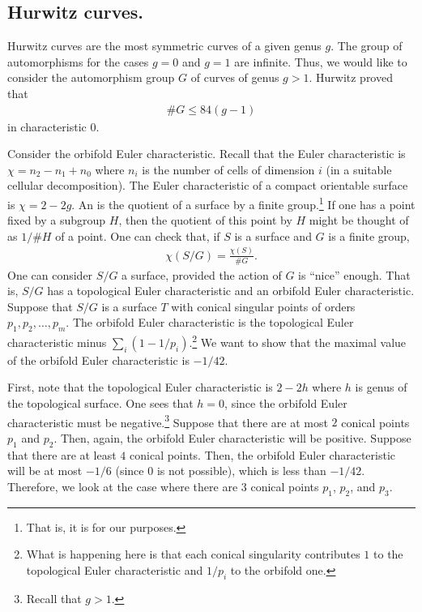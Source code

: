 \documentclass [11 pt, oneside] {article}
\begin{document}
\subsection{Hurwitz curves.}
Hurwitz curves are the most symmetric curves of a given genus $g$. The group of automorphisms for the cases $g=0$ and $g=1$ are infinite. Thus, we would like to consider the automorphism group $G$ of curves of genus $g>1$. Hurwitz proved that
\begin{align*}
	\# G \le 84(g-1)
\end{align*}
in characteristic $0$. 
\begin{esquisse}
	Consider the orbifold Euler characteristic. Recall that the Euler characteristic is $\chi =n_2-n_1+n_0$ where $n_i$ is the number of cells of dimension $i$ (in a suitable cellular decomposition). The Euler characteristic of a compact orientable surface is $\chi = 2-2g$. An  is the quotient of a surface by a finite group.\footnote{That is, it is for our purposes.} If one has a point fixed by a subgroup $H$, then the quotient of this point by $H$ might be thought of as $1/\# H$ of a point. One can check that, if $S$ is a surface and $G$ is a finite group,
	\begin{align*}
		\chi(S/G) =  \frac{\chi(S)}{\# G}.
	\end{align*}
One can consider $S/G$ a surface, provided the action of $G$ is ``nice'' enough. That is, $S/G$ has a topological Euler characteristic and an orbifold Euler characteristic. Suppose that $S/G$ is a surface $T$ with conical singular points of orders $p_1,p_2,\hdots, p_m$. The orbifold Euler characteristic is the topological Euler characteristic minus $\sum_{i}^{}  (1-1/p_i)$.\footnote{What is happening here is that each conical singularity contributes $1$ to the topological Euler characteristic and $1/p_i$ to the orbifold one.} We want to show that the maximal value of the orbifold Euler characteristic is $-1/42$.

First, note that the topological Euler characteristic is $2-2h$ where $h$ is genus of the topological surface. One sees that $h=0$, since the orbifold Euler characteristic must be negative.\footnote{Recall that $g>1$.} Suppose that there are at most $2$ conical points $p_1$ and $p_2$. Then, again, the orbifold Euler characteristic will be positive. Suppose that there are at least $4$ conical points. Then, the orbifold Euler characteristic will be at most $-1/6$ (since $0$ is not possible), which is less than $-1/42$. Therefore, we look at the case where there are $3$ conical points $p_1$, $p_2$, and $p_3$. 


\end{esquisse}
\end{document}
